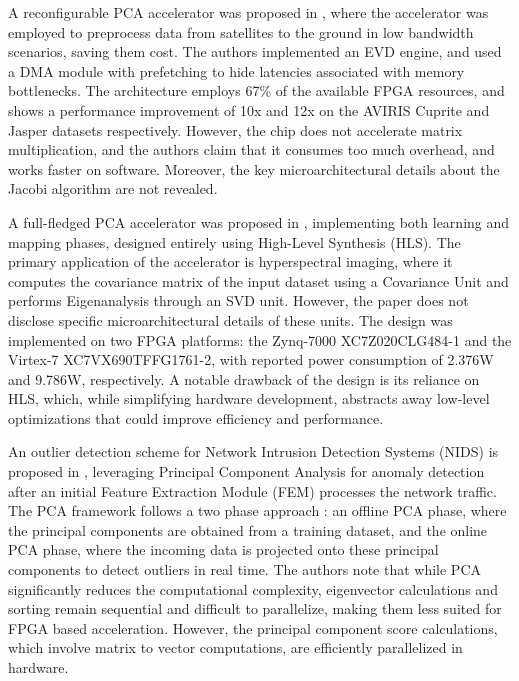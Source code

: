 A reconfigurable PCA accelerator was proposed in \cite{pca_architecture-2}, where the accelerator was employed to preprocess data from satellites to the ground in low bandwidth scenarios, saving them cost. The authors implemented an EVD engine, and used a DMA module with prefetching to hide latencies associated with memory bottlenecks. The architecture employs 67\% of the available FPGA resources, and shows a performance improvement of 10x and 12x on the AVIRIS Cuprite and Jasper datasets respectively. However, the chip does not accelerate matrix multiplication, and the authors claim that it consumes too much overhead, and works faster on software. Moreover, the key microarchitectural details about the Jacobi algorithm are not revealed. 

A full-fledged PCA accelerator was proposed in \cite{pca_architecture-3}, implementing both learning and mapping phases, designed entirely using High-Level Synthesis (HLS). The primary application of the accelerator is hyperspectral imaging, where it computes the covariance matrix of the input dataset using a Covariance Unit and performs Eigenanalysis through an SVD unit. However, the paper does not disclose specific microarchitectural details of these units. The design was implemented on two FPGA platforms: the Zynq-7000 XC7Z020CLG484-1 and the Virtex-7 XC7VX690TFFG1761-2, with reported power consumption of 2.376W and 9.786W, respectively. A notable drawback of the design is its reliance on HLS, which, while simplifying hardware development, abstracts away low-level optimizations that could improve efficiency and performance. 

An outlier detection scheme for Network Intrusion Detection Systems (NIDS) is proposed in \cite{pca_architecture-4}, leveraging Principal Component Analysis for anomaly detection after an initial Feature Extraction Module (FEM) processes the network traffic. The PCA framework follows a two phase approach : an offline PCA phase, where the principal components are obtained from a training dataset, and the online PCA phase, where the incoming data is projected onto these principal components to detect outliers in real time. The authors note that while PCA significantly reduces the computational complexity, eigenvector calculations and sorting remain sequential and difficult to parallelize, making them less suited for FPGA based acceleration. However, the principal component score calculations, which involve matrix to vector computations, are efficiently parallelized in hardware. 

